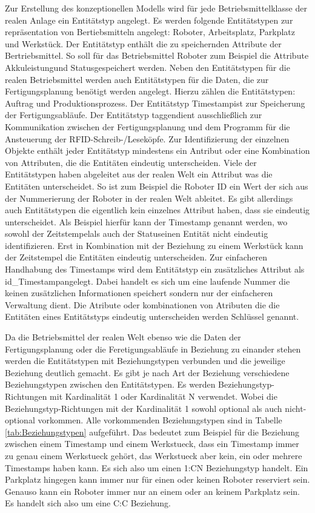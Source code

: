 Zur Erstellung des konzeptionellen Modells wird für jede Betriebsmittelklasse der realen Anlage ein Entitätstyp angelegt. Es werden folgende Entitätstypen zur repräsentation von Bertiebsmitteln angelegt: Roboter, Arbeitsplatz, Parkplatz und Werkstück. Der Entitätstyp enthält die zu speichernden Attribute der Bertriebsmittel. So soll für das Betriebsmittel Roboter zum Beispiel die Attribute \glqq Akkuleistung\grqq  und \glqq Status\grqq  gespeichert werden. Neben den Entitätstypen für die realen Betriebsmittel werden auch Entitätstypen für die Daten, die zur Fertigungsplanung benötigt werden angelegt. Hierzu zählen die Entitätstypen: Auftrag und Produktionsprozess. Der Entitätstyp \glqq Timestamp\grqq  ist zur Speicherung der Fertigungsabläufe. Der Entitätstyp \glqq taggen\grqq  dient ausschließlich zur Kommunikation zwischen der Fertigungsplanung und dem Programm für die Ansteuerung der RFID-Schreib-/Leseköpfe. Zur Identifizierung der einzelnen Objekte enthält jeder Entitätstyp mindestens ein Antribut oder eine Kombination von Attributen, die die Entitäten eindeutig unterscheiden. Viele der Entitätstypen haben abgeleitet aus der realen Welt ein Attribut was die Entitäten unterscheidet. So ist zum Beispiel die Roboter ID ein Wert der sich aus der Nummerierung der Roboter in der realen Welt ableitet. Es gibt allerdings auch Entitätstypen die eigentlich kein einzelnes Attribut haben, dass sie eindeutig unterscheidet. Als Beispiel hierfür kann der Timestamp genannt werden, wo sowohl der \glqq Zeitstempel\grqq  als auch der \grqq Status\grqq  einen Entität nicht eindeutig identifizieren. Erst in Kombination mit der Beziehung zu einem Werkstück kann der Zeitstempel die Entitäten eindeutig unterscheiden. Zur einfacheren Handhabung des Timestamps wird dem Entitätstyp ein zusätzliches Attribut als \glqq id\_Timestamp\grqq  angelegt. Dabei handelt es sich um eine laufende Nummer die keinen zusätzlichen Informationen speichert sondern nur der einfacheren Verwaltung dient. Die Atribute oder kombinationen von Atributen die die Entitäten eines Entitätstyps eindeutig unterscheiden werden Schlüssel genannt. 
 
Da die Betriebsmittel der realen Welt ebenso wie die Daten der Fertigungsplanung oder die Feretigungsabläufe in Beziehung zu einander stehen werden die Entitätstypen mit Beziehungstypen verbunden und die jeweilige Beziehung deutlich gemacht. Es gibt je nach Art der Beziehung verschiedene Beziehungstypen zwischen den Entitätstypen. Es werden Beziehungstyp-Richtungen mit Kardinalität 1 oder Kardinalität N verwendet. Wobei die Beziehungstyp-Richtungen mit der Kardinalität 1 sowohl optional als auch nicht-optional vorkommen. Alle vorkommenden Beziehungstypen sind in Tabelle \ref{tab:Beziehungstypen} aufgeführt. Das bedeutet zum Beispiel für die Beziehung zwischen einem Timestamp und einem Werkstueck, dass ein Timestamp immer zu genau einem Werkstueck gehört, das Werkstueck aber kein, ein oder mehrere Timestamps haben kann. Es sich also um einen 1:CN Beziehungstyp handelt. Ein Parkplatz hingegen kann immer nur für einen oder keinen Roboter reserviert sein. Genauso kann ein Roboter immer nur an einem oder an keinem Parkplatz sein. Es handelt sich also um eine C:C Beziehung. 


